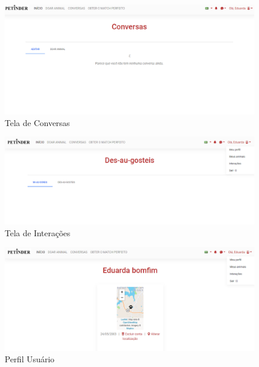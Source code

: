 \begin{apendicesenv}
\begin{flushleft}
\begin{figure}[!htbp]
    \centering
    \caption{\label{Chat}Tela de Conversas}
	\includegraphics[scale=0.50,angle=0]{imagens/Chat.png}
\end{figure}

\begin{figure}[!htbp]
    \centering
    \caption{\label{Interacoes}Tela de Interações}
	\includegraphics[scale=0.50,angle=0]{imagens/TelaInterações.png}
\end{figure}

\begin{figure}[!htbp]
    \centering
    \caption{\label{Perfil}Perfil Usuário}
	\includegraphics[scale=0.50,angle=0]{imagens/TelaPerfil.png}
\end{figure}


\end{flushleft}
\end{apendicesenv}
